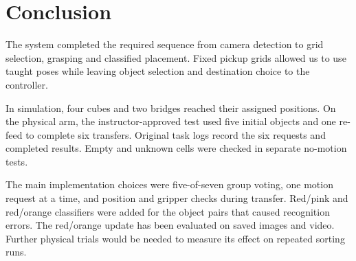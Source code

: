 \section{Conclusion}
The system completed the required sequence from camera detection to grid selection, grasping and classified placement. Fixed pickup grids allowed us to use taught poses while leaving object selection and destination choice to the controller.

In simulation, four cubes and two bridges reached their assigned positions. On the physical arm, the instructor-approved test used five initial objects and one re-feed to complete six transfers. Original task logs record the six requests and completed results. Empty and unknown cells were checked in separate no-motion tests.

The main implementation choices were five-of-seven group voting, one motion request at a time, and position and gripper checks during transfer. Red/pink and red/orange classifiers were added for the object pairs that caused recognition errors. The red/orange update has been evaluated on saved images and video. Further physical trials would be needed to measure its effect on repeated sorting runs.
